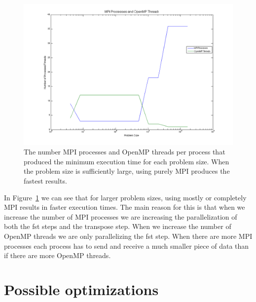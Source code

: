 \documentclass{article}
\begin{document}
	\begin{figure}[htbp]
	\begin{center}
	\includegraphics[width=15cm,keepaspectratio=true]{figs/threadsProcesses}
	\caption{The number MPI processes and OpenMP threads per process that produced the minimum execution time for each problem size. When the problem size is sufficiently large, using purely MPI produces the fastest results.}
	\label{fig:threadsProcesses}
	\end{center}
	\end{figure}

	In Figure~\ref{fig:threadsProcesses} we can see that for larger problem sizes, using mostly or completely MPI results in faster execution times. The main reason for this is that when we increase the number of MPI processes we are increasing the parallelization of both the fst steps and the transpose step. When we increase the number of OpenMP threads we are only parallelizing the fst step. When there are more MPI processes each process has to send and receive a much smaller piece of data than if there are more OpenMP threads. 





\section{Possible optimizations}
\end{document}
